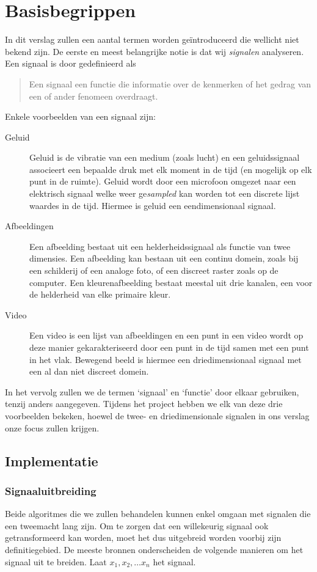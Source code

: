 \chapter{Basisbegrippen}
In dit verslag zullen een aantal termen worden ge\"introduceerd die wellicht niet bekend zijn. De eerste en meest belangrijke notie is dat wij \emph{signalen} analyseren. Een signaal is door \cite{signal} gedefinieerd als
\begin{quote}
Een signaal een functie die informatie over de kenmerken of het gedrag van een of ander fenomeen overdraagt.
\end{quote}

Enkele voorbeelden van een signaal zijn:
\begin{description}
	\item[Geluid] Geluid is de vibratie van een medium (zoals lucht) en een geluidssignaal associeert een bepaalde druk met elk moment in de tijd (en mogelijk op elk punt in de ruimte). Geluid wordt door een microfoon omgezet naar een elektrisch signaal welke weer ge\emph{sampled} kan worden tot een discrete lijst waardes in de tijd. Hiermee is geluid een eendimensionaal signaal.
	\item[Afbeeldingen] Een afbeelding bestaat uit een helderheidssignaal als functie van twee dimensies. Een afbeelding kan bestaan uit een continu domein, zoals bij een schilderij of een analoge foto, of een discreet raster zoals op de computer. Een kleurenafbeelding bestaat meestal uit drie kanalen, een voor de helderheid van elke primaire kleur.
	\item[Video] Een video is een lijst van afbeeldingen en een punt in een video wordt op deze manier gekarakteriseerd door een punt in de tijd samen met een punt in het vlak. Bewegend beeld is hiermee een driedimensionaal signaal met een al dan niet discreet domein.
\end{description}

In het vervolg zullen we de termen `signaal' en `functie' door elkaar gebruiken, tenzij anders aangegeven. Tijdens het project hebben we elk van deze drie voorbeelden bekeken, hoewel de twee- en driedimensionale signalen in ons verslag onze focus zullen krijgen.

\section{Implementatie}
\subsection{Signaaluitbreiding}
\label{signaal}
Beide algoritmes die we zullen behandelen kunnen enkel omgaan met signalen die een tweemacht lang zijn. Om te zorgen dat een willekeurig signaal ook getransformeerd kan worden, moet het dus uitgebreid worden voorbij zijn definitiegebied. De meeste bronnen onderscheiden de volgende manieren om het signaal uit te breiden.\cite{mallat,pywt} Laat $x_1, x_2, \ldots x_n$ het signaal.

